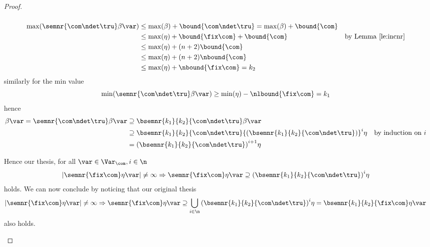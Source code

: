 \begin{proof}
\begin{inductive}
\begin{description}
\begin{equation*}
      \end{equation*}
      \begin{align*}
        \max(\semnr{\com\ndet\tru}\beta\var) & \leq \max(\beta) + \bound{\com\ndet\tru} = \max(\beta) + \bound{\com} \\
                                             & \leq \max(\eta) + \bound{\fix\com} + \bound{\com} & \text{by Lemma~\ref{le:incnr}} \\
                                             & \leq \max(\eta) + (n+2)\bound{\com} \\
                                             & \leq \max(\eta) + (n+2)\nbound{\com} \\
                                             & \leq \max(\eta) + \nbound{\fix\com} = k_2
      \end{align*}
      similarly for the min value
      \begin{equation*}
        \min(\semnr{\com\ndet\tru}\beta\var) \geq \min(\eta) - \nlbound{\fix\com} = k_1
      \end{equation*}
      hence
      \begin{align*}
        \beta\var = \semnr{\com\ndet\tru}\beta\var & \supseteq \bsemnr{k_1}{k_2}{\com\ndet\tru}\beta\var \\
                                                   & \supseteq \bsemnr{k_1}{k_2}{\com\ndet\tru}{\left(\bsemnr{k_1}{k_2}{\com\ndet\tru}\right)}^i\eta & \text{by induction on } i\\
                                                   & = {\left(\bsemnr{k_1}{k_2}{\com\ndet\tru}\right)}^{i+1}\eta
      \end{align*}
    \end{description}
    Hence our thesis, for all \(\var \in \Var_{\com}, i \in \n\)
    \begin{equation*}
      |\semnr{\fix\com}\eta\var| \neq \infty \Rightarrow
      \semnr{\fix\com}\eta\var \supseteq
      {\left(\bsemnr{k_1}{k_2}{\com\ndet\tru}\right)}^i\eta
    \end{equation*}
    holds.  We can now conclude by noticing that our original thesis
    \begin{equation*}
      |\semnr{\fix\com}\eta\var| \neq \infty \Rightarrow
      \semnr{\fix\com}\eta\var \supseteq
      \bigcup_{i\in\n}{\left(\bsemnr{k_1}{k_2}{\com\ndet\tru}\right)}^i\eta =
      \bsemnr{k_1}{k_2}{\fix\com}\eta\var
    \end{equation*}
    also holds.
  \end{inductive}
\end{proof}

